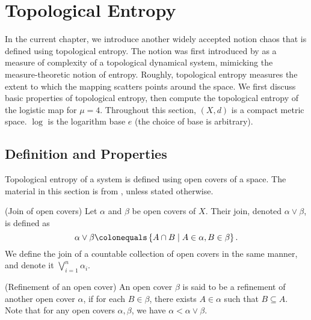 \documentclass[10pt,twoside,draft]{book}
\begin{document}
\chapter{Topological Entropy}
\label{chap:entropy}
In the current chapter, we introduce another widely accepted notion chaos that is defined using topological entropy.
The notion was first introduced by \citet{akm} as a measure of complexity of a topological dynamical system, mimicking the measure-theoretic notion of entropy.
Roughly, topological entropy measures the extent to which the mapping scatters points around the space.
We first discuss basic properties of topological entropy, then compute the topological entropy of the logistic map for $\mu = 4$.
Throughout this section, $(X,d)$ is a compact metric space.
$\log$ is the logarithm base $e$ (the choice of base is arbitrary).

\section{Definition and Properties}
Topological entropy of a system is defined using open covers of a space. 
The material in this section is from \citep{akm}, unless stated otherwise.
\begin{definition}
  (Join of open covers)
  Let $\alpha$ and $\beta$ be open covers of $X$.
  Their join, denoted $\alpha \vee \beta$, is defined as
  \begin{equation*}
    \alpha \vee \beta \ceq \setst{A \cap B}{A \in \alpha, B \in \beta}.
  \end{equation*}
  We define the join of a countable collection of open covers in the same manner, and denote it $\bigvee\limits_{i = 1}^{n} \alpha_i$.
\end{definition}
\begin{definition}
  (Refinement of an open cover)
  An open cover $\beta$ is said to be a refinement of another open cover $\alpha$, if for each $B \in \beta$, there exists $A \in \alpha$ such that $B \subseteq A$.
  Note that for any open covers $\alpha, \beta$, we have $\alpha < \alpha \vee \beta$.
\end{definition}
\end{document}
